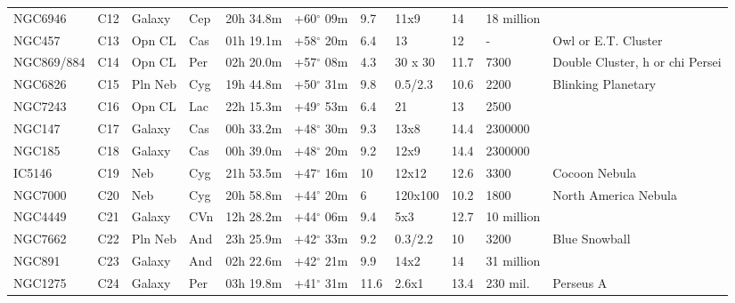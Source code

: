 \documentclass[10pt,twoside,a4paper,english]{article}
\begin{document}
\begin{longtable}{@{}lllllllllll@{}}
NGC6946    & C12           & Galaxy  & Cep & 20h 34.8m & +60$^{\circ}$ 09m & 9.7  & 11x9           & 14   & 18 million    &                                 \\ 
NGC457     & C13           & Opn CL  & Cas & 01h 19.1m & +58$^{\circ}$ 20m & 6.4  & 13             & 12   & -             & Owl or E.T. Cluster             \\ 
NGC869/884 & C14           & Opn CL  & Per & 02h 20.0m & +57$^{\circ}$ 08m & 4.3  & 30 x 30        & 11.7 & 7300          & Double Cluster, h or chi Persei \\ 
NGC6826    & C15           & Pln Neb & Cyg & 19h 44.8m & +50$^{\circ}$ 31m & 9.8  & 0.5/2.3        & 10.6 & 2200          & Blinking Planetary              \\ 
NGC7243    & C16           & Opn CL  & Lac & 22h 15.3m & +49$^{\circ}$ 53m & 6.4  & 21             & 13   & 2500          &                                 \\ 
NGC147     & C17           & Galaxy  & Cas & 00h 33.2m & +48$^{\circ}$ 30m & 9.3  & 13x8           & 14.4 & 2300000       &                                 \\ 
NGC185     & C18           & Galaxy  & Cas & 00h 39.0m & +48$^{\circ}$ 20m & 9.2  & 12x9           & 14.4 & 2300000       &                                 \\ 
IC5146     & C19           & Neb     & Cyg & 21h 53.5m & +47$^{\circ}$ 16m & 10   & 12x12          & 12.6 & 3300          & Cocoon Nebula                   \\ 
NGC7000    & C20           & Neb     & Cyg & 20h 58.8m & +44$^{\circ}$ 20m & 6    & 120x100        & 10.2 & 1800          & North America Nebula            \\ 
NGC4449    & C21           & Galaxy  & CVn & 12h 28.2m & +44$^{\circ}$ 06m & 9.4  & 5x3            & 12.7 & 10 million    &                                 \\ 
NGC7662    & C22           & Pln Neb & And & 23h 25.9m & +42$^{\circ}$ 33m & 9.2  & 0.3/2.2        & 10   & 3200          & Blue Snowball                   \\ 
NGC891     & C23           & Galaxy  & And & 02h 22.6m & +42$^{\circ}$ 21m & 9.9  & 14x2           & 14   & 31 million    &                                 \\ 
NGC1275    & C24           & Galaxy  & Per & 03h 19.8m & +41$^{\circ}$ 31m & 11.6 & 2.6x1          & 13.4 & 230 mil.      & Perseus A                       \\ 

\end{longtable}
\end{document}
